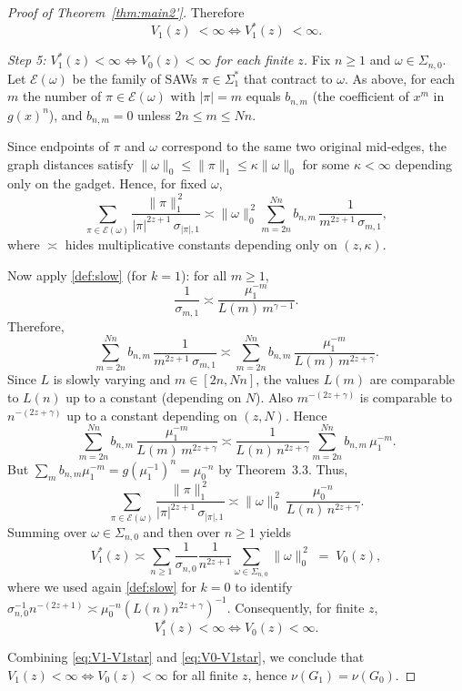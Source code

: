 \documentclass[10pt,a4paper]{amsart}
\begin{document}
\begin{proof}[Proof of Theorem~\ref{thm:main2'}]
Therefore \begin{equation}\label{eq:V1-V1star} V_1(z)\;<\infty \iff V_1^\ast(z)\;<\infty .
\end{equation}


\smallskip\noindent
\emph{Step 5: $V_1^\ast(z)<\infty \iff V_0(z)<\infty$ for each finite $z$.}
Fix $n\ge 1$ and $\omega\in\Sigma_{n,0}$.  Let $\mathcal{E}(\omega)$ be the family of SAWs
$\pi\in\Sigma_1^\ast$ that contract to $\omega$.  As above, for each $m$ the number of $\pi\in\mathcal{E}(\omega)$
with $|\pi|=m$ equals $b_{n,m}$ (the coefficient of $x^m$ in $g(x)^n$), and $b_{n,m}=0$ unless $2n\le m\le Nn$.

Since endpoints of $\pi$ and $\omega$ correspond to the same two original mid-edges, the graph distances satisfy
$\|\omega\|_0 \le \|\pi\|_1 \le \kappa \|\omega\|_0$ for some $\kappa<\infty$ depending only on the gadget.
Hence, for fixed $\omega$,
\[
\sum_{\pi\in\mathcal{E}(\omega)} \frac{\|\pi\|_1^{\,2}}{|\pi|^{2z+1}\,\sigma_{|\pi|,1}}
\asymp
\|\omega\|_0^{\,2}\sum_{m=2n}^{Nn} b_{n,m}\,\frac{1}{m^{2z+1}\,\sigma_{m,1}},
\]
where $\asymp$ hides multiplicative constants depending only on $(z,\kappa)$.

Now apply \eqref{def:slow} (for $k=1$): for all $m\ge 1$,
\[
\frac{1}{\sigma_{m,1}}
\asymp
\frac{\mu_1^{-m}}{L(m)\,m^{\gamma-1}}.
\]
Therefore,
\[
\sum_{m=2n}^{Nn} b_{n,m}\,\frac{1}{m^{2z+1}\,\sigma_{m,1}}
\asymp
\sum_{m=2n}^{Nn} b_{n,m}\,\frac{\mu_1^{-m}}{L(m)\,m^{2z+\gamma}}.
\]
Since $L$ is slowly varying and $m\in[2n,Nn]$, the values $L(m)$ are comparable to $L(n)$ up to a constant
(depending on $N$).  Also $m^{-(2z+\gamma)}$ is comparable to $n^{-(2z+\gamma)}$ up to a constant depending
on $(z,N)$.  Hence
\[
\sum_{m=2n}^{Nn} b_{n,m}\,\frac{\mu_1^{-m}}{L(m)\,m^{2z+\gamma}}
\asymp
\frac{1}{L(n)\,n^{2z+\gamma}}\sum_{m=2n}^{Nn} b_{n,m}\,\mu_1^{-m}.
\]
But $\sum_m b_{n,m}\mu_1^{-m}=g(\mu_1^{-1})^n=\mu_0^{-n}$ by Theorem~3.3.
Thus,
\[
\sum_{\pi\in\mathcal{E}(\omega)} \frac{\|\pi\|_1^{\,2}}{|\pi|^{2z+1}\,\sigma_{|\pi|,1}}
\asymp
\|\omega\|_0^{\,2}\,\frac{\mu_0^{-n}}{L(n)\,n^{2z+\gamma}}.
\]
Summing over $\omega\in\Sigma_{n,0}$ and then over $n\ge 1$ yields
\[
V_1^\ast(z)\asymp \sum_{n\ge 1}\frac{1}{\sigma_{n,0}}\frac{1}{n^{2z+1}}\sum_{\omega\in\Sigma_{n,0}}\|\omega\|_0^{\,2}
\;=\;V_0(z),
\]
where we used again \eqref{def:slow} for $k=0$ to identify
$\sigma_{n,0}^{-1}n^{-(2z+1)}\asymp \mu_0^{-n}(L(n)n^{2z+\gamma})^{-1}$.
Consequently, for finite $z$,
\begin{equation}\label{eq:V0-V1star}
V_1^\ast(z)<\infty \iff V_0(z)<\infty .
\end{equation}

Combining \eqref{eq:V1-V1star} and \eqref{eq:V0-V1star}, we conclude that
$V_1(z)<\infty \iff V_0(z)<\infty$ for all finite $z$, hence $\nu(G_1)=\nu(G_0)$.
\end{proof}
\end{document}
